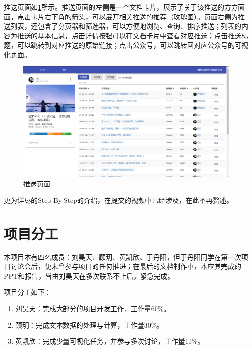 \documentclass[a4paper,12pt]{article}
\begin{document}
    推送页面如\cref{fig:tsym}所示。推送页面的左侧是一个文档卡片，展示了关于该推送的方方面面，点击卡片右下角的箭头，可以展开相关推送的推荐（玫瑰图）。页面右侧为推送列表，还包含了分页器和筛选器，可以方便地浏览、查询、排序推送；列表的内容为推送的基本信息，点击详情按钮可以在文档卡片中查看对应推送；点击推送标题，可以跳转到对应推送的原始链接；点击公众号，可以跳转回对应公众号的可视化页面。
    \begin{figure}
      \centering
      \includegraphics[width=0.9\linewidth]{tsym.png}
      \caption{推送页面}
      \label{fig:tsym}
    \end{figure}
    \label{applastpage}

    更为详尽的Step-By-Step的介绍，在提交的视频中已经涉及，在此不再赘述。
    \section{项目分工}
    本项目本有四名成员：刘昊天、顾玥、黄凯欣、于丹阳，但于丹阳同学在第一次项目讨论会后，便未曾参与项目的任何推进；在最后的文档制作中，本应其完成的PPT和报告，皆由刘昊天在多次联系不上后，紧急完成。

    项目分工如下：
    \begin{enumerate}
      \item 刘昊天：完成大部分的项目开发工作，工作量60\%。
      \item 顾玥：完成文本数据的处理与计算，工作量30\%。
      \item 黄凯欣：完成少量可视化任务，并参与多次讨论，工作量10\%。
    \end{enumerate}

\end{document}
